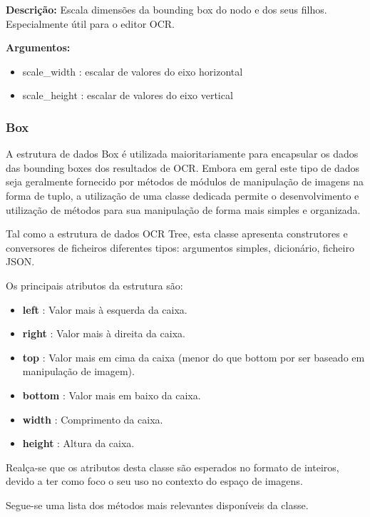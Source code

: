 
\textbf{Descrição:} Escala dimensões da bounding box do nodo e dos seus filhos. Especialmente útil para o editor OCR.

\textbf{Argumentos:}
\begin{itemize}\setlength\itemsep{-0.3em}
	\item scale\_width : escalar de valores do eixo horizontal
	\item scale\_height : escalar de valores do eixo vertical
\end{itemize}


\subsubsection{Box}
\label{box_data_structure}

A estrutura de dados Box é utilizada maioritariamente para encapsular os dados das bounding boxes dos resultados de OCR. Embora em geral este tipo de dados seja geralmente fornecido por métodos de módulos de manipulação de imagens na forma de tuplo, a utilização de uma classe dedicada permite o desenvolvimento e utilização de métodos para sua manipulação de forma mais simples e organizada.

Tal como a estrutura de dados OCR Tree, esta classe apresenta construtores e conversores de ficheiros diferentes tipos: argumentos simples, dicionário, ficheiro JSON.

Os principais atributos da estrutura são:

\begin{itemize}\setlength\itemsep{-0.3em}
	\item \textbf{left} 	: Valor mais à esquerda da caixa.
	\item \textbf{right}	: Valor mais à direita da caixa.
	\item \textbf{top} 		: Valor mais em cima da caixa (menor do que bottom por ser baseado em manipulação de imagem). 
	\item \textbf{bottom} 	: Valor mais em baixo da caixa.
	\item \textbf{width} 	: Comprimento da caixa.
	\item \textbf{height} 	: Altura da caixa.
\end{itemize}

Realça-se que os atributos desta classe são esperados no formato de inteiros, devido a ter como foco o seu uso no contexto do espaço de imagens.

Segue-se uma lista dos métodos mais relevantes disponíveis da classe.


